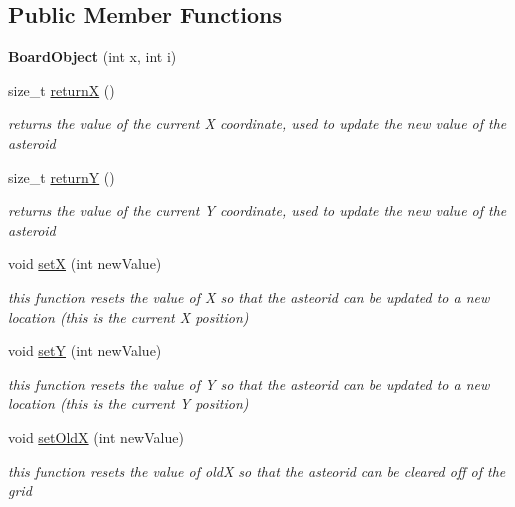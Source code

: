 \subsection*{Public Member Functions}
\begin{DoxyCompactItemize}
\item 
\hypertarget{class_board_object_aea0a667a588d6d8f74b35a1310c0b0db}{}{\bfseries Board\+Object} (int x, int i)\label{class_board_object_aea0a667a588d6d8f74b35a1310c0b0db}

\item 
size\+\_\+t \hyperlink{class_board_object_a6215e6cee5590ed64d0f69e429c3a57e}{return\+X} ()
\begin{DoxyCompactList}\small\item\em returns the value of the current X coordinate, used to update the new value of the asteroid \end{DoxyCompactList}\item 
size\+\_\+t \hyperlink{class_board_object_ae6571ea8cf75fdd085774b17b0a82c57}{return\+Y} ()
\begin{DoxyCompactList}\small\item\em returns the value of the current Y coordinate, used to update the new value of the asteroid \end{DoxyCompactList}\item 
void \hyperlink{class_board_object_a16e6a534bacc35e835151e8f749ca5af}{set\+X} (int new\+Value)
\begin{DoxyCompactList}\small\item\em this function resets the value of X so that the asteorid can be updated to a new location (this is the current X position) \end{DoxyCompactList}\item 
void \hyperlink{class_board_object_a3b1c18087121482d43146a8dcad888d5}{set\+Y} (int new\+Value)
\begin{DoxyCompactList}\small\item\em this function resets the value of Y so that the asteorid can be updated to a new location (this is the current Y position) \end{DoxyCompactList}\item 
void \hyperlink{class_board_object_a88855864ce71ac2abce2c00b4e0942a8}{set\+Old\+X} (int new\+Value)
\begin{DoxyCompactList}\small\item\em this function resets the value of old\+X so that the asteorid can be cleared off of the grid \end{DoxyCompactList}\item 

\end{DoxyCompactItemize}
